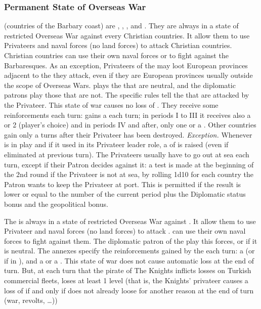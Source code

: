 \subsubsection{Permanent State of Overseas War}
 \Barbaresques (countries of the Barbary coast)
are \paysCyrenaique, \paysTripoli, \paysTunisie, \paysAlgerie and
\paysMaroc. They are always in a state of restricted Overseas War against
every Christian countries.
\bparag It allow them to use Privateers and naval forces (no land forces) to
attack Christian countries. Christian countries can use their own naval forces
or \Presidios to fight against the Barbaresques.
\bparag As an exception, Privateers of the \Barbaresques may loot European
provinces adjacent to the \STZ they attack, even if they are European
provinces usually outside the scope of Overseas Wars.
\bparag \TUR plays the  that are neutral, and the
diplomatic patrons play those that are not. The specific rules tell the \STZ
that are attacked by the Privateer.
\bparag This state of war causes no loss of \STAB.
\bparag[Reinforcements] They receive some reinforcements each turn:
 gains a \corsaire\facemoins each turn; in periods I to III it
receives also a \ND or 2 \NGD (player's choice) and in periods IV and after,
only one \NGD or a \NDE. Other countries gain only a \corsaire{}
turns after their Privateer has been destroyed.
\bparag \textit{Exception.} Whenever  is in play and if it used
in its Privateer leader role, a \corsaire\facemoins of  is
raised (even if eliminated at previous turn).
 The Privateers usually have to go out at sea
each turn, except if their Patron decides against it: a test is made at the
beginning of the 2nd round if the Privateer is not at sea, by rolling 1d10 for
each country the Patron wants to keep the Privateer at port.  This is
permitted if the result is lower or equal to the number of the current period
plus the Diplomatic status bonus and the geopolitical bonus.

 The  is always in a state of restricted
Overseas War against \TUR.
\bparag It allow them to use Privateer and naval forces (no land forces) to
attack \TUR. \TUR can use their own naval forces to fight against them.
\bparag The diplomatic patron of the  play this forces, or
\SPA if it is neutral.
\bparag The annexes specify the reinforcements gained by the 
each turn: a \corsaire\facemoins (or \Faceplus if in ), and a
\NGD or a \NDE.
\bparag This state of war does not cause automatic \STAB loss at the end of
turn.  But, at each turn that the pirate of The Knights inflicts losses on
Turkish commercial fleets, \TUR loses at least 1 \STAB level (that is, the
Knights' privateer causes a loss of \STAB if and only if \TUR does not already
loose \STAB for another reason at the end of turn (war, revolts, \ldots))


